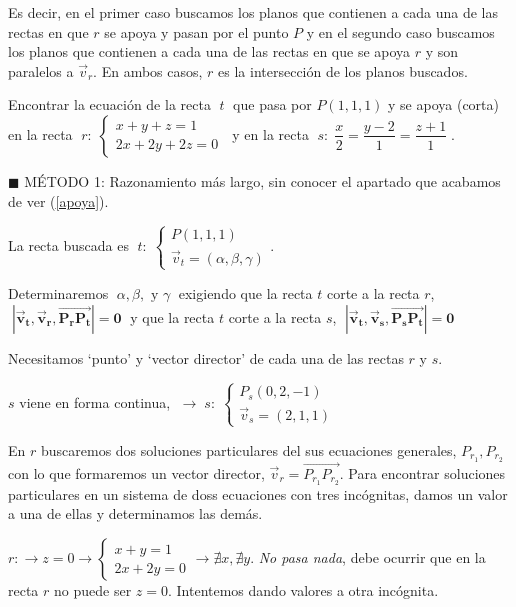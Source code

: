 Es decir, en el primer caso buscamos los planos que contienen a cada una de las rectas en que $r$ se apoya y pasan por el punto $P$ y en el segundo caso buscamos los planos que contienen a cada una de las rectas en que se apoya $r$ y son paralelos a $\vec v_r$. En ambos casos, $r$ es la intersección de los planos buscados.


\begin{ejem}
Encontrar la ecuación de la recta $\;t\;$ que pasa por $P(1,1,1)$ y se apoya (corta) en la recta $\;r:\; \begin{cases} x+y+z=1\\2x+2y+2z=0 \end{cases}\;$ y en la recta $\;s:\; \dfrac{x}{2}=\dfrac{y-2}{1}=\dfrac{z+1}{1}\;$. 	
\end{ejem}

\noindent $\blacksquare$ MÉTODO 1: Razonamiento más largo, sin conocer el apartado que acabamos de ver (\ref{apoya}).

La recta buscada es $\;t:\;\begin{cases} P(1,1,1)\\ \vec v_t=(\alpha,\beta,\gamma) \end{cases}$.

Determinaremos $\;\alpha,\beta, \text{ y }\gamma\;$ exigiendo que la recta $t$ corte a la recta $r$, $\;\boldsymbol{|\vec v_t, \vec v_r, \overrightarrow{P_rP_t}|=0}\;$ y que la recta $t$ corte a la recta $s$, $\;\boldsymbol{|\vec v_t, \vec v_s, \overrightarrow{P_sP_t}|=0}\;$

Necesitamos `punto' y `vector director' de cada una de las rectas $r$ y $s$.

$s$ viene en forma continua, $\; \to \; s:\;\begin{cases} P_s(0,2,-1)\\ \vec v_s=(2,1,1) \end{cases}$

En $r$ buscaremos dos soluciones	 particulares del sus ecuaciones generales, $P_{r_1}, P_{r_2}$ con lo que formaremos un vector director, $\vec v_r=\overrightarrow{P_{r_1} P_{r_2}}$. Para encontrar soluciones particulares en un sistema de doss ecuaciones con tres incógnitas, damos un valor a una de ellas y determinamos las demás.

$r:\to z=0 \to \begin{cases} x+y=1\\2x+2y=0 \end{cases} \to \nexists x, \nexists y$. \textit{No pasa nada}, debe ocurrir que en la recta $r$ no puede ser $z=0$. Intentemos dando valores a otra incógnita.


